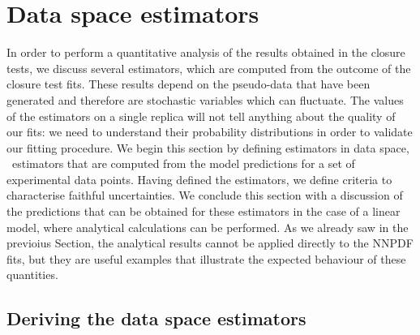 \section{Data space estimators} 
\label{sec:ClosureEstimators}

In order to perform a quantitative analysis of the results obtained in the
closure tests, we discuss several estimators, which are computed from the
outcome of the closure test fits. These results depend on the pseudo-data that
have been generated and therefore are stochastic variables which can fluctuate.
The values of the estimators on a single replica will not tell anything about
the quality of our fits: we need to understand their probability distributions
in order to validate our fitting procedure. We begin this section by defining
estimators in data space, \ie\ estimators that are computed from the model
predictions for a set of experimental data points. Having defined the
estimators, we define criteria to characterise faithful uncertainties. We
conclude this section with a discussion of the predictions that can be obtained
for these estimators in the case of a linear model, where analytical
calculations can be performed. As we already saw in the previoius Section, the
analytical results cannot be applied directly to the NNPDF fits, but they are
useful examples that illustrate the expected behaviour of these quantities.

\subsection{Deriving the data space estimators}
\label{sec:ClosureEstimatorsDerivation}

